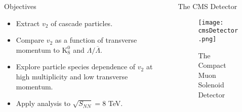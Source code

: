 \documentclass[final]{beamer}
\newlength{\sepwid}
\newlength{\onecolwid}
\newlength{\twocolwid}
\begin{document}
\begin{frame}[t]
\begin{columns}[t]
\begin{column}{\onecolwid}


\begin{alertblock}{Objectives}

\begin{itemize}
\item Extract $ v_{2} $ of cascade particles.
\item Compare $ v_{2} $ as a function of transverse momentum to $
\mathrm{K}_{\mathrm{S}}^{0} $ and $ \Lambda/\overline{\Lambda} $.
\item Explore particle species dependence of $ v_{2} $ at high multiplicity and
low transverse momentum.
\item Apply analysis to $ \sqrt{S_{NN}} = 8 $ TeV.
\end{itemize}

\end{alertblock}
\end{column} %

\begin{column}{\sepwid}\end{column} %

\begin{column}{\twocolwid} %

\begin{columns}[t,totalwidth=\twocolwid] %

\begin{column}{\onecolwid}\vspace{-.6in} %


\begin{block}{The CMS Detector}
\begin{figure}[H]
  \centering
  \texttt{[image: cmsDetector.png]}
  \caption{The Compact Muon Solenoid Detector}
\end{figure}


\end{block}


\end{column}
\end{columns}
\end{column}
\end{columns}
\end{frame}
\end{document}
